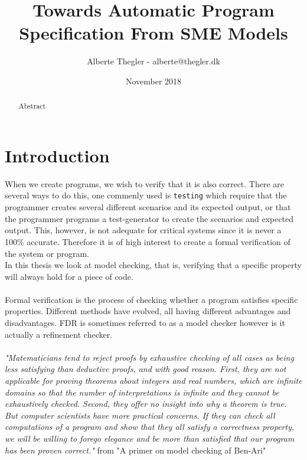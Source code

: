 \documentclass[a4paper]{report}
\title{Towards Automatic Program Specification From SME Models}
\author{Alberte Thegler - alberte@thegler.dk}
\date{November 2018}
\begin{document}
\maketitle

\begin{abstract}
\begin{doublespace}
Abstract

\end{doublespace}
\end{abstract}



\newpage
\tableofcontents

\newpage
{}
\chapter{Introduction}
When we create programs, we wish to verify that it is also correct. There are several ways to do this, one commenly used is \texttt{testing} which require that the programmer creates several different scenarios and its expected output, or that the programmer programs a test-generator to create the scenarios and expected output. This, however, is not adequate for critical systems since it is never a 100\% accurate. Therefore it is of high interest to create a formal verification of the system or program.\\


In this thesis we look at model checking, that is, verifying that a specific property will always hold for a piece of code.
\\\\

Formal verification is the process of checking whether a program satisfies specific properties. Different methods have evolved, all having different advantages and disadvantages. FDR is sometimes referred to as a model checker however is it actually a refinement checker.
\\\\


\textit{"Matematicians tend to reject proofs by exhaustive checking of all cases as being less satisfying than deductive proofs, and with good reason. First, they are not applicable for proving theorems about integers and real numbers, which are infinite domains so that the number of interpretations is infinite and they cannot be exhaustively checked. Second, they offer no insight into why a theorem is true. But computer scientists have more practical concerns. If they can check all computations of a program and show that they all satisfy a correctness property, we will be willing to forego elegance and be more than satisfied that our program has been proven correct."} from "A primer on model checking af Ben-Ari" \cite{Ben-ari2010}\
\newpage
\end{document}
